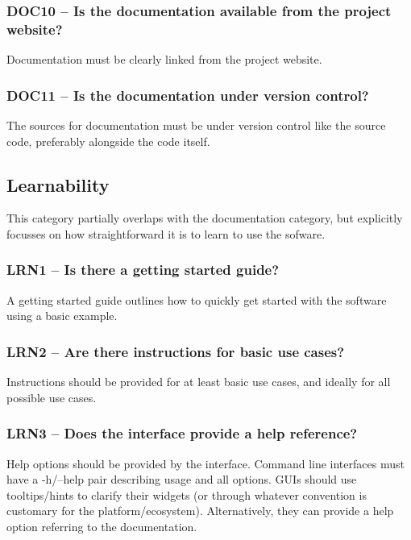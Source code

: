 \documentclass[a4paper,11pt]{article}
\begin{document}
\subsubsection{DOC10 -- Is the documentation available from the project website?}

Documentation must be clearly linked from the project website.

\subsubsection{DOC11 -- Is the documentation under version control?}

The sources for documentation must be under version control like the source
code, preferably alongside the code itself.

\subsection{Learnability}

This category partially overlaps with the documentation category, but explicitly
focusses on how straightforward it is to learn to use the sofware.

\subsubsection{LRN1 -- Is there a getting started guide?}

A getting started guide outlines how to quickly get started with the software
using a basic example.

\subsubsection{LRN2 -- Are there instructions for basic use cases?}

Instructions should be provided for at least basic use cases, and ideally for
all possible use cases.

\subsubsection{LRN3 -- Does the interface provide a help reference?}

Help options should be provided by the interface. Command line interfaces must
have a -h/--help pair describing usage and all options. GUIs should use tooltips/hints to clarify
their widgets (or through whatever convention is customary for the
platform/ecosystem). Alternatively, they can provide a help option referring to
the documentation.
\end{document}
